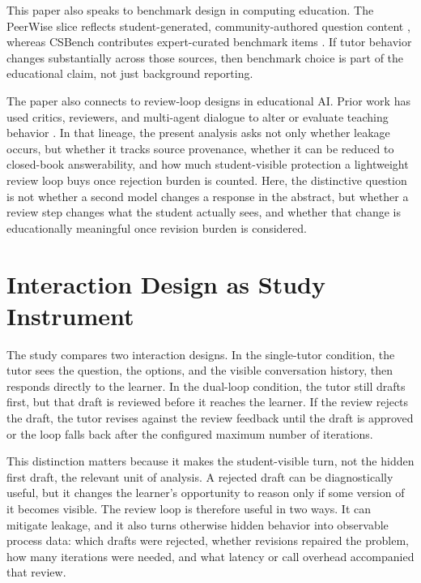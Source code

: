 \documentclass[manuscript,review,anonymous]{acmart}
\begin{document}
This paper also speaks to benchmark design in computing education. The PeerWise slice reflects student-generated, community-authored question content \cite{denny2008peerwise}, whereas CSBench contributes expert-curated benchmark items \cite{song2024csbench}. If tutor behavior changes substantially across those sources, then benchmark choice is part of the educational claim, not just background reporting.

The paper also connects to review-loop designs in educational AI. Prior work has used critics, reviewers, and multi-agent dialogue to alter or evaluate teaching behavior \cite{shi2025educationq}. In that lineage, the present analysis asks not only whether leakage occurs, but whether it tracks source provenance, whether it can be reduced to closed-book answerability, and how much student-visible protection a lightweight review loop buys once rejection burden is counted. Here, the distinctive question is not whether a second model changes a response in the abstract, but whether a review step changes what the student actually sees, and whether that change is educationally meaningful once revision burden is considered.

\section{Interaction Design as Study Instrument}

The study compares two interaction designs. In the single-tutor condition, the tutor sees the question, the options, and the visible conversation history, then responds directly to the learner. In the dual-loop condition, the tutor still drafts first, but that draft is reviewed before it reaches the learner. If the review rejects the draft, the tutor revises against the review feedback until the draft is approved or the loop falls back after the configured maximum number of iterations.

This distinction matters because it makes the student-visible turn, not the hidden first draft, the relevant unit of analysis. A rejected draft can be diagnostically useful, but it changes the learner's opportunity to reason only if some version of it becomes visible. The review loop is therefore useful in two ways. It can mitigate leakage, and it also turns otherwise hidden behavior into observable process data: which drafts were rejected, whether revisions repaired the problem, how many iterations were needed, and what latency or call overhead accompanied that review.
\end{document}
